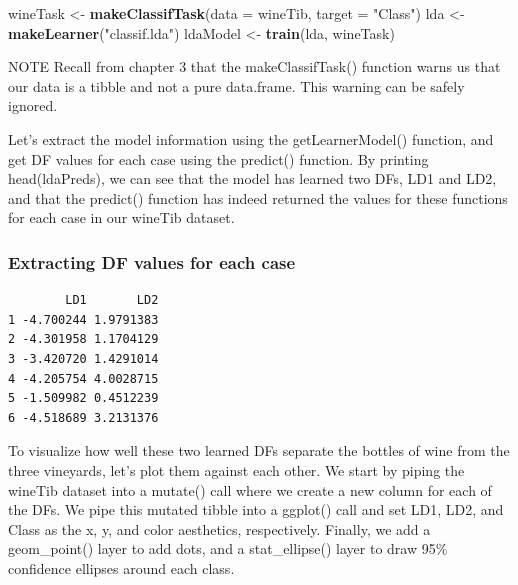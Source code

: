 \documentclass[
]{article}
\newenvironment{Shaded}{\begin{snugshade}}{\end{snugshade}}
\newcommand{\AttributeTok}[1]{\textcolor[rgb]{0.13,0.29,0.53}{#1}}
\newcommand{\FunctionTok}[1]{\textcolor[rgb]{0.13,0.29,0.53}{\textbf{#1}}}
\newcommand{\NormalTok}[1]{#1}
\newcommand{\OtherTok}[1]{\textcolor[rgb]{0.56,0.35,0.01}{#1}}
\newcommand{\SpecialCharTok}[1]{\textcolor[rgb]{0.81,0.36,0.00}{\textbf{#1}}}
\newcommand{\StringTok}[1]{\textcolor[rgb]{0.31,0.60,0.02}{#1}}
\begin{document}
\begin{Shaded}
\begin{Highlighting}[]
\NormalTok{wineTask }\OtherTok{\textless{}{-}} \FunctionTok{makeClassifTask}\NormalTok{(}\AttributeTok{data =}\NormalTok{ wineTib, }\AttributeTok{target =} \StringTok{"Class"}\NormalTok{)}
\NormalTok{lda }\OtherTok{\textless{}{-}} \FunctionTok{makeLearner}\NormalTok{(}\StringTok{"classif.lda"}\NormalTok{)}
\NormalTok{ldaModel }\OtherTok{\textless{}{-}} \FunctionTok{train}\NormalTok{(lda, wineTask)}
\end{Highlighting}
\end{Shaded}

NOTE Recall from chapter 3 that the makeClassifTask() function warns us
that our data is a tibble and not a pure data.frame. This warning can be
safely ignored.

Let's extract the model information using the getLearnerModel()
function, and get DF values for each case using the predict() function.
By printing head(ldaPreds), we can see that the model has learned two
DFs, LD1 and LD2, and that the predict() function has indeed returned
the values for these functions for each case in our wineTib dataset.

\subsubsection{Extracting DF values for each
case}\label{extracting-df-values-for-each-case}

\begin{Shaded}
\end{Shaded}

\begin{verbatim}
        LD1       LD2
1 -4.700244 1.9791383
2 -4.301958 1.1704129
3 -3.420720 1.4291014
4 -4.205754 4.0028715
5 -1.509982 0.4512239
6 -4.518689 3.2131376
\end{verbatim}

To visualize how well these two learned DFs separate the bottles of wine
from the three vineyards, let's plot them against each other. We start
by piping the wineTib dataset into a mutate() call where we create a new
column for each of the DFs. We pipe this mutated tibble into a ggplot()
call and set LD1, LD2, and Class as the x, y, and color aesthetics,
respectively. Finally, we add a geom\_point() layer to add dots, and a
stat\_ellipse() layer to draw 95\% confidence ellipses around each
class.
\end{document}
